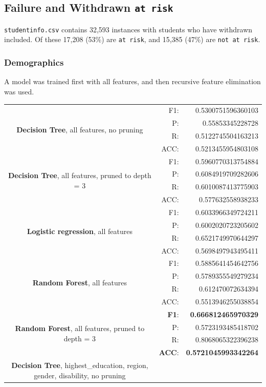 \documentclass{article}
\begin{document}
\subsection{Failure and Withdrawn \texttt{at risk}}
\texttt{studentinfo.csv} contains 32,593 instances with students who have withdrawn included. Of these 17,208 (53\%) are \texttt{at risk}, and 15,385 (47\%) are \texttt{not at risk}.
\subsubsection{Demographics}
A model was trained first with all features, and then recursive feature elimination was used.
\begin{center}
\begin{tabular}{|c|rr|}
\hline
\multirow{4}{10cm}{\textbf{Decision Tree}, all features, no pruning}
&F1:&  0.5300751596360103\\
&P:&   0.55853345228728\\
&R:&   0.5122745504163213\\
&ACC:& 0.5213455954803108\\
\hline
\multirow{4}{10cm}{\textbf{Decision Tree}, all features, pruned to depth = 3}
&F1:&   0.5960770313754884\\
&P:&   0.6084919709282606\\
&R:&   0.6010087413775903\\
&ACC:& 0.577632558938233\\
\hline
\multirow{4}{10cm}{\textbf{Logistic regression}, all features}
&F1:&  0.6033966349724211\\
&P:&   0.6002020723205602\\
&R:&   0.6521749970644297\\
&ACC:& 0.5698497943495411\\
\hline
\multirow{4}{10cm}{\textbf{Random Forest}, all features }
&F1:&  0.5885641454642756 \\
&P:&   0.5789355549279234 \\
&R:&   0.612470072634394 \\
&ACC:& 0.5513946255038854 \\
\hline
\multirow{4}{10cm}{\textbf{Random Forest}, all features, pruned to depth = 3}
&\textbf{F1}:&  \textbf{0.666812465970329} \\
&P:&   0.5723193485418702 \\
&R:&   0.8068065322396238 \\
&\textbf{ACC}:& \textbf{0.5721045993342264} \\
\hline
\hline
\hline
\multirow{4}{10cm}{\textbf{Decision Tree}, highest\_education, region, gender, disability, no pruning}

\end{tabular}
\end{center}
\end{document}
